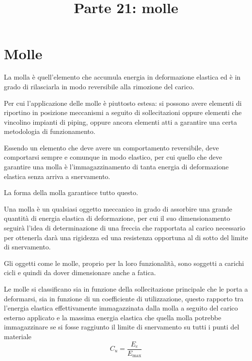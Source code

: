 \documentclass[a4paper, 15pt]{article}
\title{Parte 21: molle}
\date{}
\begin{document}
\maketitle
{}
\setcounter{tocdepth}{5}  %
\tableofcontents 
\newpage



\section{Molle}
\begin{adjustwidth}{2in}{}
	La molla è quell'elemento che accumula energia in deformazione elastica ed è in grado di rilasciarla in modo reversibile alla rimozione del carico. 
	
	Per cui l'applicazione delle molle è piuttosto estesa: si possono avere elementi di riportino in posizione meccanismi a seguito di sollecitazioni oppure elementi che vincolino impianti di piping, oppure ancora elementi atti a garantire una certa metodologia di funzionamento. \newline 
	
	Essendo un elemento che deve avere un comportamento reversibile, deve comportarsi  sempre e comunque in modo elastico, per cui quello che deve garantire una molla è l'immagazzinamento di tanta energia di deformazione elastica senza arriva a snervamento. \newline 
	
	La forma della molla garantisce tutto questo. 
	
	Una molla è un qualsiasi oggetto meccanico in grado di assorbire una grande quantità di energia elastica di deformazione, per cui il suo dimensionamento seguirà l'idea di determinazione di una freccia che rapportata al carico necessario per ottenerla darà una rigidezza ed una resistenza opportuna al di  sotto del limite di snervamento. \newline
	
	Gli oggetti come le molle, proprio per la loro funzionalità, sono soggetti a carichi cicli e quindi da dover dimensionare anche a fatica. \newline 
	
	Le molle si classificano sia in funzione della sollecitazione principale che le porta a deformarsi, sia in funzione di un coefficiente di utilizzazione, questo rapporto tra l'energia elastica effettivamente immagazzinata dalla  molla a seguito del carico esterno applicato e la massima energia elastica che quella molla potrebbe immagazzinare se si fosse raggiunto il limite di snervamento su tutti i punti del materiale
	\[C_u = \dfrac{E_e}{E_{\max}}\]
\end{adjustwidth}
\newpage
\end{document}
